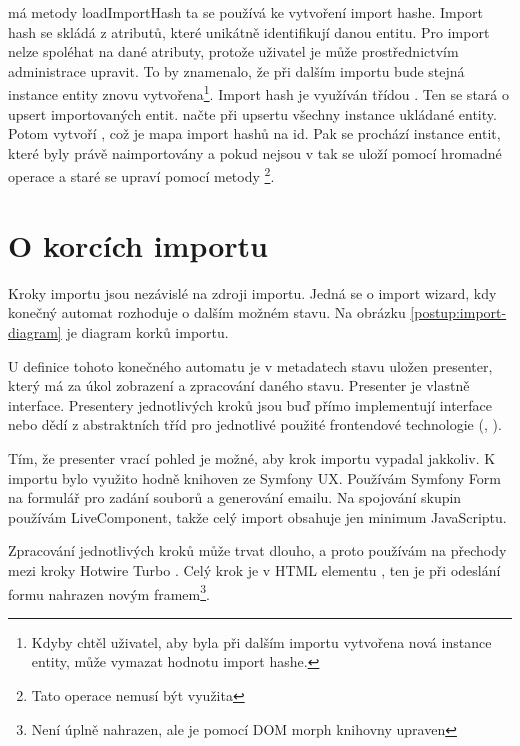  má metody loadImportHash ta se používá ke vytvoření import hashe. Import hash se skládá z atributů, které unikátně identifikují danou entitu. Pro import nelze spoléhat na dané atributy, protože uživatel je může prostřednictvím administrace upravit. To by znamenalo, že při dalším importu bude stejná instance entity znovu vytvořena\footnote{Kdyby chtěl uživatel, aby byla při dalším importu vytvořena nová instance entity, může vymazat hodnotu import hashe.}.
Import hash je využíván třídou . Ten se stará o upsert importovaných entit.
 načte při upsertu všechny instance ukládané entity.
Potom vytvoří , což je mapa import hashů na id.
Pak se prochází instance entit, které byly právě naimportovány a pokud nejsou v  tak se uloží pomocí hromadné operace a staré  se upraví pomocí metody \footnote{Tato operace nemusí být využita}.


\section{O korcích importu}

Kroky importu jsou nezávislé na zdroji importu. 
Jedná se o import wizard, kdy konečný automat  rozhoduje o dalším možném stavu. 
Na obrázku \ref{postup:import-diagram} je diagram korků importu.


U definice tohoto konečného automatu je v metadatech stavu uložen presenter, který má za úkol zobrazení a zpracování daného stavu.
Presenter je vlastně interface. Presentery jednotlivých kroků jsou buď přímo implementují interface nebo dědí z abstraktních tříd
pro jednotlivé použité frontendové technologie (, ).

Tím, že presenter vrací pohled je možné, aby krok importu vypadal jakkoliv.
K importu bylo využito hodně knihoven ze Symfony UX.
Používám Symfony Form na formulář pro zadání souborů a generování emailu.
Na spojování skupin používám LiveComponent, takže celý import obsahuje jen minimum JavaScriptu.

Zpracování jednotlivých kroků může trvat dlouho, a proto používám na přechody mezi kroky Hotwire Turbo .
Celý krok je v HTML elementu , ten je při odeslání formu nahrazen novým framem\footnote{Není úplně nahrazen, ale je pomocí DOM morph knihovny upraven}. 


